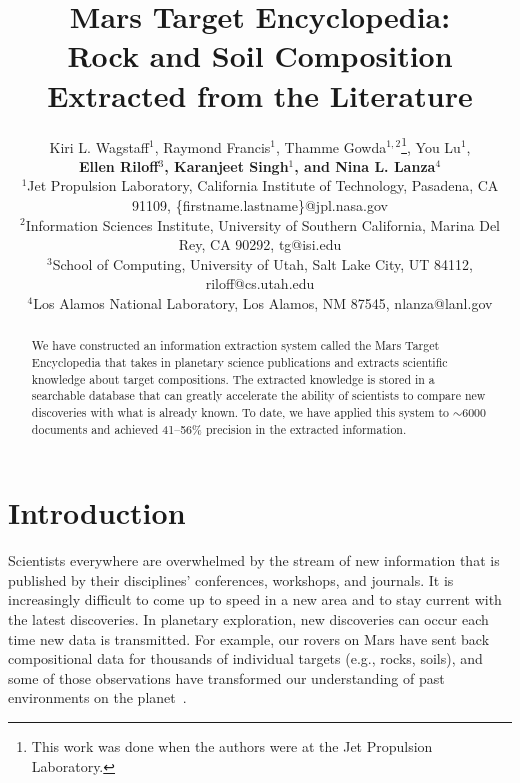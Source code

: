 \documentclass[letterpaper]{article} %
\begin{document}
%
\title{Mars Target Encyclopedia: \\ Rock and Soil Composition Extracted
from the Literature}
\author{
Kiri L. Wagstaff$^1$,
Raymond Francis$^1$,
Thamme Gowda$^{1,2}$\thanks{This work was done when the authors were at
the Jet Propulsion Laboratory.},
You Lu$^1$,\\
{\Large \bf 
Ellen Riloff$^3$, 
Karanjeet Singh$^1$\footnotemark[1], and
Nina L. Lanza$^4$}\\
$^1$Jet Propulsion Laboratory, California Institute of Technology,
Pasadena, CA 91109, \{firstname.lastname\}@jpl.nasa.gov\\
$^2$Information Sciences Institute, University of Southern
California,
Marina Del Rey, CA 90292, tg@isi.edu\\
$^3$School of Computing, University of Utah,
Salt Lake City, UT 84112, riloff@cs.utah.edu\\
$^4$Los Alamos National Laboratory, Los Alamos, NM 87545,
nlanza@lanl.gov\\
}
\maketitle
\begin{abstract}
We have constructed an information extraction system called the Mars
Target Encyclopedia that takes in planetary science publications
and extracts scientific knowledge about target compositions.
The extracted knowledge is stored in a searchable database that can
greatly accelerate the ability of scientists to compare new
discoveries with what is already known.  To date, we have applied this
system to $\sim$6000 documents and achieved 41--56\% precision in the
extracted information.  
\end{abstract}

\section{Introduction}

Scientists everywhere are overwhelmed by the stream of new information
that is published by their disciplines' conferences, workshops, and
journals.  It is increasingly difficult to come up to speed in a
new area and to stay current with the latest discoveries.  In
planetary exploration, new discoveries can occur each time
new data is transmitted.  For example, our rovers on Mars have sent
back compositional data for thousands of individual targets (e.g.,
rocks, soils), and some of those observations have transformed our
understanding of past environments on the
planet~\cite{grotzinger:ykb14}. 
\end{document}
